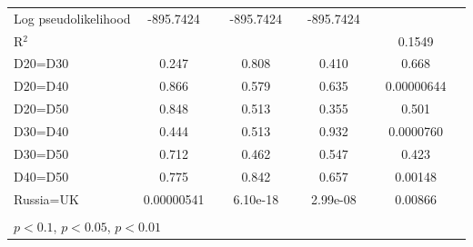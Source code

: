 \begin{tabular}{l|cccccc|cc}
Log pseudolikelihood  & -895.7424   &         &    -895.7424              &         &     -895.7424             &         &           &   \\ 
R$^2$       &                  &         &                  &         &                  &         &      0.1549    &   \\ 
D20=D30         &    0.247         &         &    0.808         &         &    0.410         &         &    0.668         &         \\
D20=D40         &    0.866         &         &    0.579         &         &    0.635         &         &0.00000644         &         \\
D20=D50         &    0.848         &         &    0.513         &         &    0.355         &         &    0.501         &         \\
D30=D40         &    0.444         &         &    0.513         &         &    0.932         &         &0.0000760         &         \\
D30=D50         &    0.712         &         &    0.462         &         &    0.547         &         &    0.423         &         \\
D40=D50         &    0.775         &         &    0.842         &         &    0.657         &         &  0.00148         &         \\
Russia=UK       &0.00000541         &         & 6.10e-18         &         & 2.99e-08         &         &  0.00866         &         \\
\hline\hline
\multicolumn{9}{p{16cm}}{\tiny }\\
\multicolumn{9}{l}{\tiny \sym{*} \(p<0.1\), \sym{**} \(p<0.05\), \sym{***} \(p<0.01\)}\\
\end{tabular}